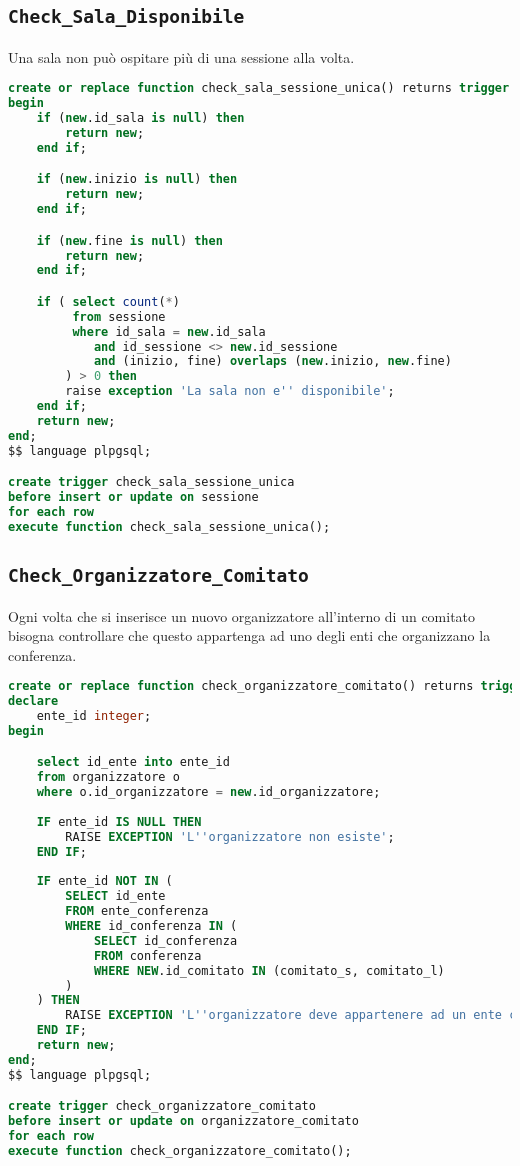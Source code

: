 \subsection{\texttt{Check\_Sala\_Disponibile}}\label{trigger:saladisponibile}
Una sala non può ospitare più di una sessione alla volta.
\begin{lstlisting}[caption={\texttt{Check\_sala\_sessione\_unica}}, language=SQL, style=mystyle]
create or replace function check_sala_sessione_unica() returns trigger as $$
begin
    if (new.id_sala is null) then
        return new;
    end if;

    if (new.inizio is null) then
        return new;
    end if;

    if (new.fine is null) then
        return new;
    end if;

    if ( select count(*) 
         from sessione 
         where id_sala = new.id_sala 
            and id_sessione <> new.id_sessione
            and (inizio, fine) overlaps (new.inizio, new.fine)
        ) > 0 then
        raise exception 'La sala non e'' disponibile';
    end if;
    return new;
end;
$$ language plpgsql;

create trigger check_sala_sessione_unica
before insert or update on sessione
for each row
execute function check_sala_sessione_unica();
\end{lstlisting}
\subsection{\texttt{Check\_Organizzatore\_Comitato}}\label{trigger:check_organizzatore_comitato}
Ogni volta che si inserisce un nuovo organizzatore all'interno di un comitato bisogna controllare che questo appartenga ad uno degli enti che organizzano la conferenza.
\begin{lstlisting}[language=SQL, style=mystyle, caption={\texttt{Check\_organizzatori\_comitato}}]
create or replace function check_organizzatore_comitato() returns trigger as $$
declare
    ente_id integer;
begin

    select id_ente into ente_id
    from organizzatore o
    where o.id_organizzatore = new.id_organizzatore;
    
    IF ente_id IS NULL THEN
        RAISE EXCEPTION 'L''organizzatore non esiste';
    END IF;
    
    IF ente_id NOT IN (
        SELECT id_ente
        FROM ente_conferenza
        WHERE id_conferenza IN (
            SELECT id_conferenza
            FROM conferenza
            WHERE NEW.id_comitato IN (comitato_s, comitato_l)
        )
    ) THEN
        RAISE EXCEPTION 'L''organizzatore deve appartenere ad un ente che ha organizzato la conferenza';
    END IF;
    return new;
end;
$$ language plpgsql;

create trigger check_organizzatore_comitato
before insert or update on organizzatore_comitato
for each row
execute function check_organizzatore_comitato();
\end{lstlisting}
